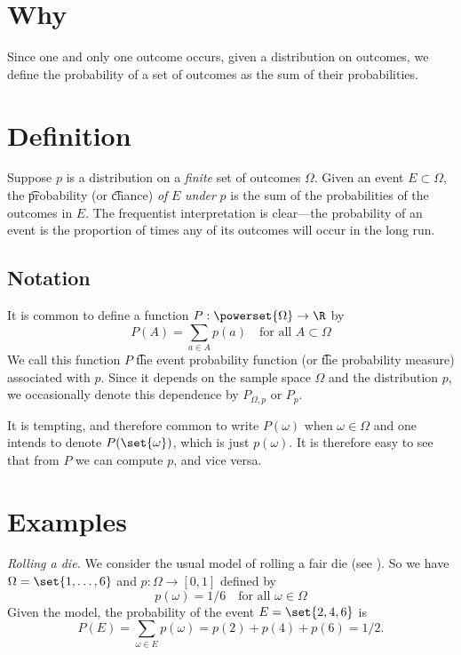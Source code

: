 
\section*{Why}

Since one and only one outcome occurs, given a distribution on outcomes, we define the probability of a set of outcomes as the sum of their probabilities.

\section*{Definition}

Suppose $p$ is a distribution on a \textit{finite} set of outcomes $\Omega $.
Given an event $E \subset \Omega $, the \t{probability} (or \t{chance}) \textit{of} $E$ \textit{under} $p$ is the sum of the probabilities of the outcomes in $E$.
The frequentist interpretation is clear---the probability of an event is the proportion of times any of its outcomes will occur in the long run.

\subsection*{Notation}

It is common to define a function $P: \powerset{\Omega } \to \R $ by
\[
P(A) = \sum_{a \in A} p(a) \quad \text{for all } A \subset \Omega
\]
We call this function $P$ \t{the event probability function} (or \t{the probability measure}) associated with $p$.
Since it depends on the sample space $\Omega $ and the distribution $p$, we occasionally denote this dependence by $P_{\Omega , p}$ or $P_p$.

It is tempting, and therefore common to write $P(\omega )$ when $\omega  \in \Omega $ and one intends to denote $P(\set{\omega })$, which is just $p(\omega )$.
It is therefore easy to see that from $P$ we can compute $p$, and vice versa.

\section*{Examples}

\textit{Rolling a die.}
We consider the usual model of rolling a fair die (see ).
So we have $\Omega  = \set{1, \dots , 6}$ and $p: \Omega  \to [0,1]$ defined by
\[
p(\omega ) = 1/6 \quad \text{for all } \omega  \in \Omega
\]
Given the model, the probability of the event $E = \set{2, 4, 6}$ is
\[
\textstyle
P(E) = \sum_{\omega  \in E} p(\omega ) = p(2) + p(4) + p(6) = 1/2.
\]

